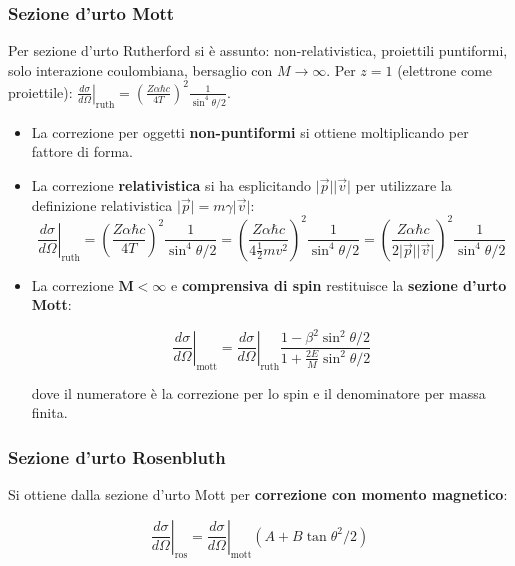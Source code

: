 \documentclass[10pt, a4paper]{scrartcl}
\newcommand*\Eval[3]{\left.#1\right\rvert_{#2}^{#3}}
\numberwithin{equation}{subsection}
\theoremstyle{style1}
\newenvironment{boxenv}[1][]{
    \begin{eqbox}[#1]
    }{
   \end{eqbox}
}
\begin{document}
\subsubsection{Sezione d'urto Mott}
Per sezione d'urto Rutherford si \`e assunto: non-relativistica, proiettili puntiformi, solo interazione coulombiana, bersaglio con $M\to \infty$. Per $z=1$ (elettrone come proiettile): $\Eval{\frac{d \sigma }{d \Omega } }{\text{ruth}}{}=  \left(\frac{Z\alpha  \hbar  c}{4T}\right) ^2 \frac{1}{\sin ^4 \theta  /2 }$.

\begin{itemize}
	\item La correzione per oggetti \textbf{non-puntiformi} si ottiene moltiplicando per fattore di forma.

	\item La correzione \textbf{relativistica} si ha esplicitando $\lvert \vec{p} \rvert \lvert \vec{v} \rvert $ per utilizzare la definizione relativistica $\lvert \vec{p} \rvert = m \gamma \lvert \vec{v} \rvert $:
		\begin{equation}
			\Eval{\frac{d \sigma }{d \Omega } }{\text{ruth}}{}= \left(\frac{Z\alpha  \hbar  c}{4T}\right) ^2 \frac{1}{\sin ^4 \theta  /2 } = \left(\frac{Z \alpha  \hbar  c}{4 \frac{1}{2}mv^2}\right) ^2 \frac{1}{\sin^4 \theta / 2} = \left(\frac{Z \alpha  \hbar  c}{2 \lvert \vec{p} \rvert \lvert \vec{v} \rvert }\right) ^2 \frac{1}{\sin^4 \theta / 2} 
		\end{equation}
	\item La correzione $\mathbf{M < \infty} $ e \textbf{comprensiva di spin} restituisce la \textbf{sezione d'urto Mott}:
		\begin{boxenv}[]
		\begin{equation}
			\Eval{\frac{d \sigma }{d \Omega } }{\text{mott}}{}= \Eval{\frac{d \sigma }{d \Omega } }{\text{ruth}}{} \frac{1- \beta ^2 \sin^2 \theta /2}{1 + \frac{2E}{M} \sin^2 \theta  / 2} 
		\end{equation}
		\end{boxenv}
	\noindent dove il numeratore \`e la correzione per lo spin e il denominatore per massa finita.	
\end{itemize}
\subsubsection{Sezione d'urto Rosenbluth}
Si ottiene dalla sezione d'urto Mott per \textbf{correzione con momento magnetico}:
\begin{boxenv}[]
\begin{equation}
\Eval{\frac{d \sigma }{d \Omega } }{\text{ros}}{}=\Eval{\frac{d \sigma }{d \Omega } }{\text{mott}}{} \left(A+B \tan \theta^2 / 2\right) 
\end{equation}
\end{boxenv}
\end{document}
